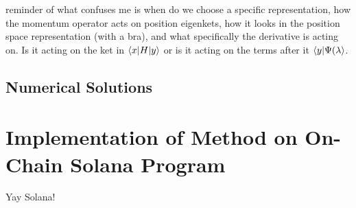 \documentclass[12pt]{article}
\numberwithin{equation}{section}
\begin{document}
reminder of what confuses me is when do we choose a specific representation, how the momentum operator acts on position eigenkets, how it looks in the position space representation (with a bra), and what specifically the derivative is acting on. Is it acting on the ket in $\braket{x | H | y}$ or is it acting on the terms after it $\braket{y | \Psi(\lambda}$.

\subsection{Numerical Solutions}


\section{Implementation of Method on On-Chain Solana Program}
Yay Solana!
\end{document}
